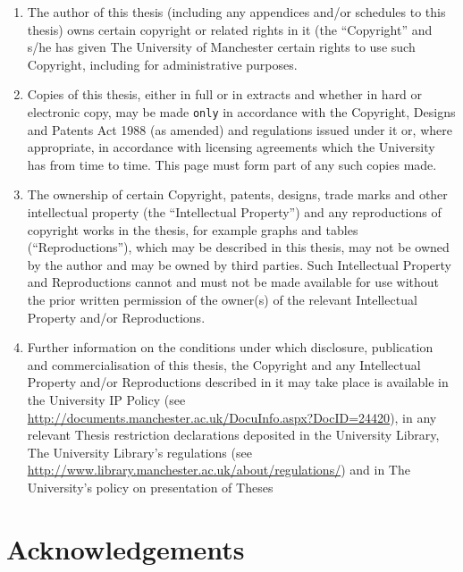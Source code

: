 \begin{enumerate}
    \item The author of this thesis (including any appendices and/or schedules
        to this thesis) owns certain copyright or related rights in it (the
        ``Copyright'' and s/he has given The University of Manchester certain rights to use such Copyright, including for administrative purposes.

    \item Copies of this thesis, either in full or in extracts and whether in
    hard or electronic copy, may be made \texttt{only} in accordance with the Copyright, Designs and Patents Act 1988 (as amended) and regulations issued under it or, where appropriate, in accordance with licensing agreements which the University has from time to time. This page must form part of any such copies made.

    \item The ownership of certain Copyright, patents, designs, trade marks
        and other intellectual property (the ``Intellectual Property'') and any
        reproductions of copyright works in the thesis, for example graphs and
        tables (``Reproductions''), which may be described in this thesis, may not be owned by the author and may be owned by third parties. Such Intellectual Property and Reproductions cannot and must not be made available for use without the prior written permission of the owner(s) of the relevant Intellectual Property and/or Reproductions.

    \item Further information on the conditions under which disclosure,
        publication and commercialisation of this thesis, the Copyright and any
        Intellectual Property and/or Reproductions described in it may take
        place is available in the University IP Policy (see
        \href{http://documents.manchester.ac.uk/DocuInfo.aspx?DocID=24420}{\url{http://documents.manchester.ac.uk/DocuInfo.aspx?DocID=24420}}),
        in any relevant Thesis restriction declarations deposited in the
        University Library, The University Library's regulations (see
        \href{http://www.library.manchester.ac.uk/about/regulations/}{\url{http://www.library.manchester.ac.uk/about/regulations/}}) and in The University's policy on presentation of Theses
\end{enumerate}

\clearpage

\section*{Acknowledgements}


